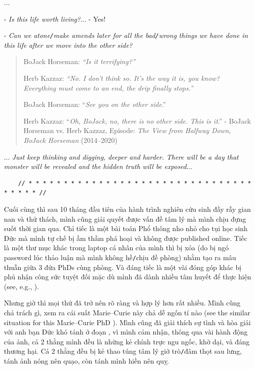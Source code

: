 \documentclass[12pt]{article}
\numberwithin{equation}{section}
\begin{document}
$\ldots$

- \textit{Is this life worth living?}$\ldots$ - Yes!

- \textit{Can we atone\texttt{/}make amends later for all the bad\texttt{/}wrong things we have done in this life after we move into the other side?}
\begin{quotation}    
    BoJack Horseman: \textit{``Is it terrifying?''}
    
    Herb Kazzaz: \textit{``No. I don't think so. It's the way it is, you know? Everything must come to an end, the drip finally stops.''}
    
    BoJack Horseman: ``\textit{See you on the other side}.''
    
    Herb Kazzaz: ``\textit{Oh, BoJack, no, there is no other side. This is it}.'' - BoJack Horseman vs. Herb Kazzaz,  Episode: \textit{The View from Halfway Down}, \textit{BoJack Horseman} (2014--2020)
\end{quotation}
$\ldots$ \textit{Just keep thinking and digging, deeper and harder. There will be a day that monster will be revealed and the hidden truth will be exposed}$\ldots$

\begin{verbatim}
    // * * * * * * * * * * * * * * * * * * * * * * * * * * * * * * * * * * * * * //
\end{verbatim}

\noindent
{} Cuối cùng thì sau 10 tháng đầu tiên của hành trình nghiên cứu sinh đầy rẫy gian nan và thử thách, mình cũng giải quyết được vấn đề tâm lý mà mình chịu đựng suốt thời gian qua. Chỉ tiếc là một bài toán Phổ thông nho nhỏ cho tụi học sinh Đức mà mình tự chế bị ầm thầm phá hoại và không được published online. Tiếc là một thư mục khác trong laptop cá nhân của mình thì bị xóa (do bị ngó password lúc thảo luận mà mình không hề\texttt{/}chịu đề phòng) nhằm tạo ra mâu thuẫn giữa 3 đứa PhDs cùng phòng. Và đáng tiếc là một vài đóng góp khác bị phủ nhận công sức tuyệt đối mặc dù mình đã dành nhiều tâm huyết để thực hiện (see, e.g., \cite{phill2018,Young-Powell2018}).

Nhưng giờ thì mọi thứ đã trở nên rõ ràng và hợp lý hơn rất nhiều. Mình cũng chả trách gì, xem ra cái suất Marie--Curie này chả dễ ngốn tí nào (see the similar situation for this Marie--Curie PhD \cite{FundamentalPessimist2020}). Mình cũng đã giải thích sự tình và hòa giải với anh bạn Đức khó tánh ở đoạn , vì mình cảm nhận, thông qua vài hành động của ảnh, cả 2 thằng mình đều là những kẻ chính trực ngu ngốc, khờ dại, và đáng thương hại. Cả 2 thằng đều bị kẻ thao túng tâm lý giở trò\texttt{/}đâm thọt sau lưng, tánh ảnh nóng nên quạo, còn tánh mình hiền nên quỵ.
\end{document}
